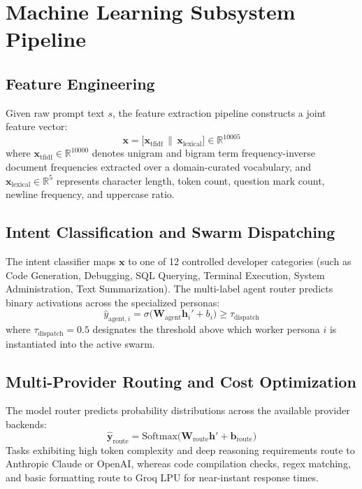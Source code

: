 \documentclass[12pt,a4paper]{report}
\begin{document}
\section{Machine Learning Subsystem Pipeline}

\subsection{Feature Engineering}
Given raw prompt text $s$, the feature extraction pipeline constructs a joint feature vector:
\begin{equation}
    \mathbf{x} = \big[ \mathbf{x}_{\text{tfidf}} \,\parallel\, \mathbf{x}_{\text{lexical}} \big] \in \mathbb{R}^{10005}
\end{equation}
where $\mathbf{x}_{\text{tfidf}} \in \mathbb{R}^{10000}$ denotes unigram and bigram term frequency-inverse document frequencies extracted over a domain-curated vocabulary, and $\mathbf{x}_{\text{lexical}} \in \mathbb{R}^5$ represents character length, token count, question mark count, newline frequency, and uppercase ratio.

\subsection{Intent Classification and Swarm Dispatching}
The intent classifier maps $\mathbf{x}$ to one of 12 controlled developer categories (such as Code Generation, Debugging, SQL Querying, Terminal Execution, System Administration, Text Summarization). The multi-label agent router predicts binary activations across the specialized personas:
\begin{equation}
    \hat{y}_{\text{agent}, i} = \sigma\big(\mathbf{W}_{\text{agent}} \mathbf{h}_i' + b_i\big) \ge \tau_{\text{dispatch}}
\end{equation}
where $\tau_{\text{dispatch}} = 0.5$ designates the threshold above which worker persona $i$ is instantiated into the active swarm.

\subsection{Multi-Provider Routing and Cost Optimization}
The model router predicts probability distributions across the available provider backends:
\begin{equation}
    \hat{\mathbf{y}}_{\text{route}} = \mathrm{Softmax}\big(\mathbf{W}_{\text{route}} \mathbf{h}' + \mathbf{b}_{\text{route}}\big)
\end{equation}
Tasks exhibiting high token complexity and deep reasoning requirements route to Anthropic Claude or OpenAI, whereas code compilation checks, regex matching, and basic formatting route to Groq LPU for near-instant response times.
\end{document}
